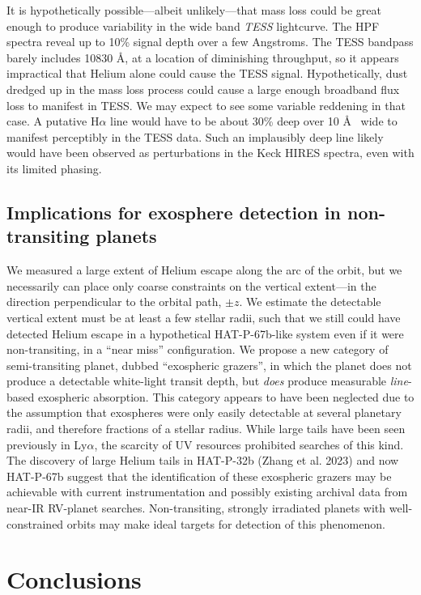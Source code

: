 \documentclass[twocolumn]{aastex631}
\begin{document}
It is hypothetically possible---albeit unlikely---that mass loss could be great enough to produce variability in the wide band \emph{TESS} lightcurve.  The HPF spectra reveal up to 10\% signal depth over a few Angstroms.  The TESS bandpass barely includes 10830 \AA, at a location of diminishing throughput, so it appears impractical that Helium alone could cause the TESS signal.  Hypothetically, dust dredged up in the mass loss process could cause a large enough broadband flux loss to manifest in TESS.  We may expect to see some variable reddening in that case.  A putative H$\alpha$ line would have to be about 30\% deep over 10 \AA~ wide to manifest perceptibly in the TESS data.  Such an implausibly deep line likely would have been observed as perturbations in the Keck HIRES spectra, even with its limited phasing.

\subsection{Implications for exosphere detection in non-transiting planets}

We measured a large extent of Helium escape along the arc of the orbit, but we necessarily can place only coarse constraints on the vertical extent---in the direction perpendicular to the orbital path, $\pm z$.  We estimate the detectable vertical extent must be at least a few stellar radii, such that we still could have detected Helium escape in a hypothetical HAT-P-67b-like system even if it were non-transiting, in a ``near miss'' configuration.  We propose a new category of semi-transiting planet, dubbed ``exospheric grazers'', in which the planet does not produce a detectable white-light transit depth, but \emph{does} produce measurable \emph{line}-based exospheric absorption.  This category appears to have been neglected due to the assumption that exospheres were only easily detectable at several planetary radii, and therefore fractions of a stellar radius.  While large tails have been seen previously in Ly$\alpha$, the scarcity of UV resources prohibited searches of this kind.  The discovery of large Helium tails in HAT-P-32b (Zhang et al. 2023) and now HAT-P-67b suggest that the identification of these exospheric grazers may be achievable with current instrumentation and possibly existing archival data from near-IR RV-planet searches.  Non-transiting, strongly irradiated planets with well-constrained orbits may make ideal targets for detection of this phenomenon.


\section{Conclusions}
\end{document}
